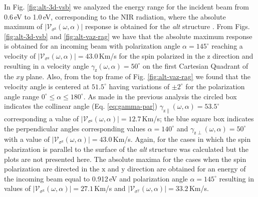 \documentclass[prb,11pt,tightenlines,twocolumn,aps]{revtex4-1}
\begin{document}
In Fig. \ref{fig:alt-3d-vsb} we analyzed the energy range for the incident beam
from 0.6\,eV to 1.0\,eV, corresponding to the NIR radiation, where the absolute
maximum of $|\mathcal{V}_{\sigma^{\mathrm{z}}}(\omega,\alpha)|$ response is
obtained for the \emph{alt} structure .
% 
{\color{red} From Figs. \ref{fig:alt-3d-vsb} and \ref{fig:alt-vaz-rag} we have
that the absolute maximum response is obtained for an incoming beam with
polarization angle $\alpha=145^{\circ}$ reaching a velocity of
$|\mathcal{V}_{\sigma^{\mathrm{z}}}(\omega,\alpha)| = 43.0$\,Km/s for the spin
polarized in the $\mathrm{z}$ direction and resulting in a velocity angle
$\gamma_{\mathrm{z}}(\omega,\alpha)=50^{\circ}$ on the first Cartesian Quadrant
of the $xy$ plane.
% 
Also, from the top frame of Fig. \ref{fig:alt-vaz-rag} we found that the
velocity angle is centered at $51.5^{\circ}$ having variations of $\pm
2^{\circ}$ for the polarization angle range $0^{\circ} \leq
\alpha \leq 180^{\circ}$.
% 
As made in the previous analysis the circled box indicates the collinear angle
(Eq. \eqref{eq:gamma-par}) $\gamma_{\mathrm{z}\parallel}(\omega,\alpha) =
53.5^{\circ}$ corresponding a value of
$|\mathcal{V}_{\sigma^{\mathrm{z}}}(\omega,\alpha)| = 12.7$\,Km/s; the blue
square box indicates the perpendicular angles corresponding values
$\alpha=140^{\circ}$ and $\gamma_{\mathrm{z}\perp}(\omega,\alpha)=50^{\circ}$
with a value of $|\mathcal{V}_{\sigma^{\mathrm{z}}}
(\omega,\alpha)|=43.0$\,Km/s.}
% 
Again, for the cases in which the spin polarization is parallel to the surface
of the \emph{alt} structure was calculated but the plots are not presented
here. The absolute maxima for the cases when the spin polarization are directed
in the $\mathrm{x}$ and $\mathrm{y}$ direction are obtained for an energy of
the incoming beam equal to 0.912\,eV and polarization angle
$\alpha=145^{\circ}$ resulting in values of
$|\mathcal{V}_{\sigma^{\mathrm{x}}}(\omega,\alpha)|=27.1$\,Km/s and
$|\mathcal{V}_{\sigma^{\mathrm{y}}}(\omega,\alpha)|=33.2$\,Km/s.

\end{document}
